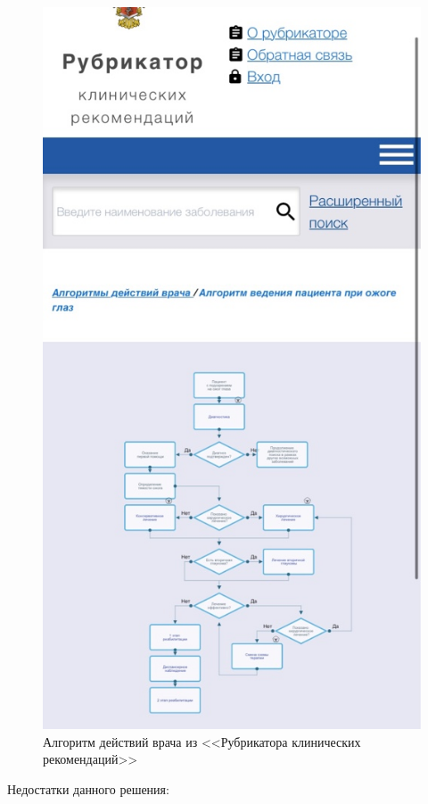 \begin{enumerate}
     \begin{figure}
        \includegraphics[scale=0.6]{styles/diploma/inc/prog3_2.jpeg}
        \caption{Алгоритм действий врача из <<Рубрикатора клинических рекомендаций>>}
        \label{fig:fig08}
    \end{figure}
    Недостатки данного решения:
    

\end{enumerate}
